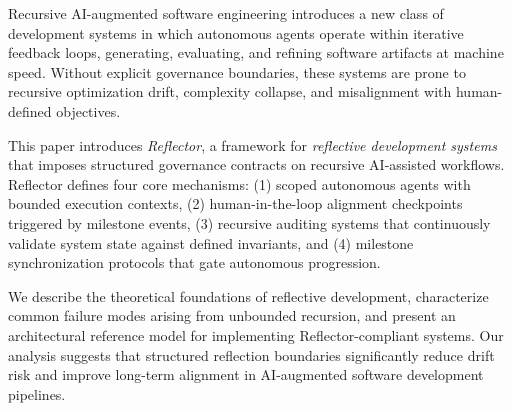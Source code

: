 Recursive AI-augmented software engineering introduces a new class of development
systems in which autonomous agents operate within iterative feedback loops, generating,
evaluating, and refining software artifacts at machine speed. Without explicit governance
boundaries, these systems are prone to recursive optimization drift, complexity collapse,
and misalignment with human-defined objectives.

This paper introduces \textit{Reflector}, a framework for \textit{reflective development systems}
that imposes structured governance contracts on recursive AI-assisted workflows. Reflector
defines four core mechanisms: (1) scoped autonomous agents with bounded execution contexts,
(2) human-in-the-loop alignment checkpoints triggered by milestone events, (3) recursive
auditing systems that continuously validate system state against defined invariants, and
(4) milestone synchronization protocols that gate autonomous progression.

We describe the theoretical foundations of reflective development, characterize common
failure modes arising from unbounded recursion, and present an architectural reference
model for implementing Reflector-compliant systems. Our analysis suggests that structured
reflection boundaries significantly reduce drift risk and improve long-term alignment
in AI-augmented software development pipelines.
